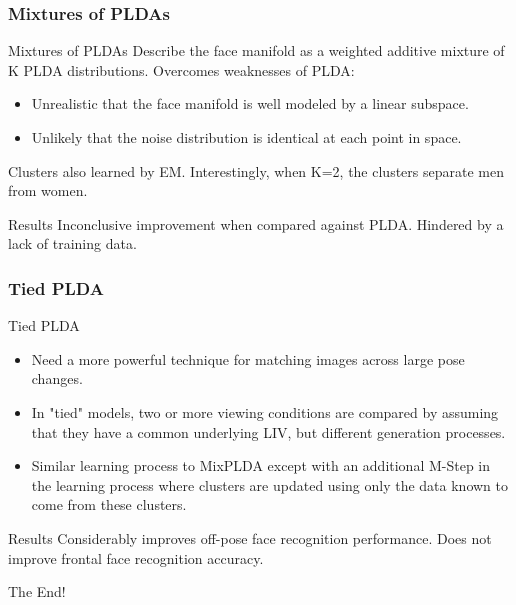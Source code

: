 \documentclass{beamer}
\begin{document}
\begin{frame}
\frametitle{Mixtures of PLDAs}
\begin{block}{Mixtures of PLDAs}
Describe the face manifold as a weighted additive mixture of K PLDA distributions.
\pause
Overcomes weaknesses of PLDA:
\pause
\begin{itemize}
\item Unrealistic that the face manifold is well modeled by a linear subspace.
\pause
\item Unlikely that the noise distribution is identical at each point in space.
\end{itemize}
\pause
Clusters also learned by EM. Interestingly, when K=2, the clusters separate men from women.
\end{block}
\pause
\begin{block}{Results}
Inconclusive improvement when compared against PLDA. Hindered by a lack of training data.
\end{block}
\end{frame}

\begin{frame}
\frametitle{Tied PLDA}
\begin{block}{Tied PLDA}
\begin{itemize}
\item Need a more powerful technique for matching images across large pose changes.
\pause
\item In "tied" models, two or more viewing conditions are compared by assuming that they have a common underlying LIV, but different generation processes.
\pause
\item Similar learning process to MixPLDA except with an additional M-Step in the learning process where clusters are updated using only the data known to come from these clusters.
\end{itemize}
\end{block}
\pause
\begin{block}{Results}
Considerably improves off-pose face recognition performance. Does not improve frontal face recognition accuracy.
\end{block}
\end{frame}

\begin{frame}
\centerline{The End!}
\end{frame}

\end{document}
